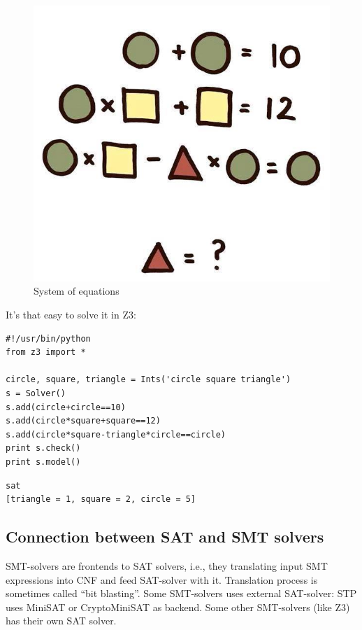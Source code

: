 \begin{figure}[H]
\centering
\includegraphics[scale=0.3]{SMT/equation.jpg}
\caption{System of equations}
\end{figure}

It's that easy to solve it in Z3:

\begin{lstlisting}
#!/usr/bin/python
from z3 import *

circle, square, triangle = Ints('circle square triangle')
s = Solver()
s.add(circle+circle==10)
s.add(circle*square+square==12)
s.add(circle*square-triangle*circle==circle)
print s.check()
print s.model()
\end{lstlisting}

\begin{lstlisting}
sat
[triangle = 1, square = 2, circle = 5]
\end{lstlisting}

\subsection{Connection between \ac{SAT} and \ac{SMT} solvers}

\ac{SMT}-solvers are frontends to \ac{SAT} solvers, i.e.,
they translating input SMT expressions into \ac{CNF} and feed SAT-solver with it.
Translation process is sometimes called ``bit blasting''.
Some \ac{SMT}-solvers uses external SAT-solver: STP uses MiniSAT or CryptoMiniSAT as backend.
Some other \ac{SMT}-solvers (like Z3) has their own SAT solver.


















